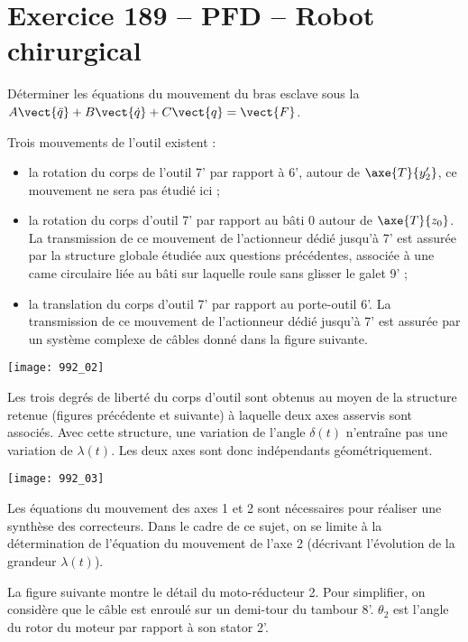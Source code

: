 \section*{Exercice 189 -- PFD -- Robot chirurgical}
\setcounter{exo}{0}

\begin{obj}
Déterminer les équations du mouvement du bras esclave sous la 
$A\vect{\ddot{q}}+B\vect{\dot{q}}+C\vect{q}=\vect{F}$.
\end{obj}


Trois mouvements de l’outil existent :
\begin{itemize}
\item la rotation du corps de l’outil 7’ par rapport à 6’, autour de $\axe{T}{y_2'}$, ce mouvement ne sera pas étudié ici ;
\item la rotation du corps d’outil 7’ par rapport au bâti 0 autour de $\axe{T}{z_0}$. La transmission de ce mouvement de
l’actionneur dédié jusqu’à 7’ est assurée par la structure globale étudiée aux questions précédentes, associée
à une came circulaire liée au bâti sur laquelle roule sans glisser le galet 9’ ;
\item la translation du corps d’outil 7’ par rapport au porte-outil 6’. La transmission de ce mouvement de l’actionneur
dédié jusqu’à 7’ est assurée par un système complexe de câbles donné dans la figure suivante.
\end{itemize}


\begin{center}
\texttt{[image: 992\_02]}
\end{center}

Les trois degrés de liberté du corps d’outil sont obtenus au moyen de la structure retenue (figures précédente et suivante) à
laquelle deux axes asservis sont associés. Avec cette structure, une variation de l’angle $\delta(t)$ n’entraîne pas une
variation de $\lambda(t)$. Les deux axes sont donc indépendants géométriquement.


\begin{center}
\texttt{[image: 992\_03]}
\end{center}

Les équations du mouvement des axes 1 et 2 sont nécessaires pour réaliser une synthèse
des correcteurs. Dans le cadre de ce sujet, on se limite à la détermination de l’équation du mouvement de l’axe
2 (décrivant l’évolution de la grandeur $\lambda(t)$).

La figure suivante montre le détail du moto-réducteur 2. Pour simplifier, on considère que le câble est enroulé sur un
demi-tour du tambour 8’. $\theta_2$ est l’angle du rotor du moteur par rapport à son stator 2’.


